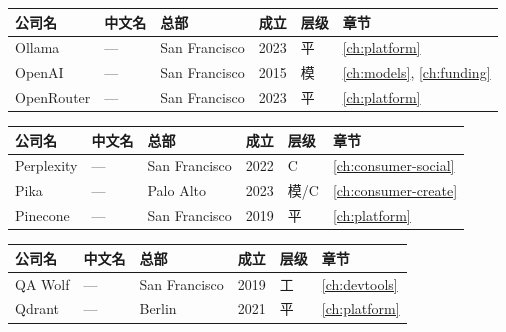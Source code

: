 \bigskip

\nopagebreak
\begin{tabularx}{\textwidth}{@{}l X l l l l@{}}
\toprule
\rowcolor{figLightGray}
\textbf{公司名} & \textbf{中文名} & \textbf{总部} & \textbf{成立} & \textbf{层级} & \textbf{章节} \\
\midrule
Ollama              & ---             & San Francisco & 2023 & 平   & \ref{ch:platform} \\
OpenAI              & ---             & San Francisco & 2015 & 模   & \ref{ch:models}, \ref{ch:funding} \\
OpenRouter          & ---             & San Francisco & 2023 & 平   & \ref{ch:platform} \\
\bottomrule
\end{tabularx}

\bigskip

\nopagebreak
\begin{tabularx}{\textwidth}{@{}l X l l l l@{}}
\toprule
\rowcolor{figLightGray}
\textbf{公司名} & \textbf{中文名} & \textbf{总部} & \textbf{成立} & \textbf{层级} & \textbf{章节} \\
\midrule
Perplexity          & ---             & San Francisco & 2022 & C    & \ref{ch:consumer-social} \\
Pika                & ---             & Palo Alto     & 2023 & 模/C & \ref{ch:consumer-create} \\
Pinecone            & ---             & San Francisco & 2019 & 平   & \ref{ch:platform} \\
\bottomrule
\end{tabularx}

\bigskip

\nopagebreak
\begin{tabularx}{\textwidth}{@{}l X l l l l@{}}
\toprule
\rowcolor{figLightGray}
\textbf{公司名} & \textbf{中文名} & \textbf{总部} & \textbf{成立} & \textbf{层级} & \textbf{章节} \\
\midrule
QA Wolf             & ---             & San Francisco & 2019 & 工   & \ref{ch:devtools} \\
Qdrant              & ---             & Berlin        & 2021 & 平   & \ref{ch:platform} \\
\bottomrule
\end{tabularx}

\bigskip

